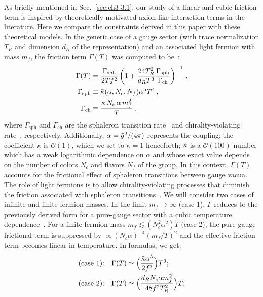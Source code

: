 As briefly mentioned in Sec.~\ref{sec:ch3-3.1}, our study of a linear and cubic friction term is inspired by theoretically motivated axion-like interaction terms in the literature. Here we compare the constraints derived in this paper with these theoretical models.
In the generic case of a gauge sector (with trace normalization $T_R$ and dimension $d_R$ of the representation) and an associated light fermion with mass $m_f$, the friction term $\Gamma (T)$ was computed to be~\cite{Berghaus:2020ekh}:
\begin{align}
    \Gamma (T)&=\frac{\Gamma_{\mathrm{sph}}}{2 T f^{2}}\left(1 + \frac{24 T_{R}^{2}}{d_{R} T^3} \frac{\Gamma_{\mathrm{sph}}}{\Gamma_{\mathrm{ch}}}\right)^{-1}\,, \label{eq:ch3-gamma1} \\
    \Gamma_{\mathrm{sph}}&\equiv\Tilde{\kappa}(\alpha,N_c,N_f)\alpha^5 T^4\,, \\
    \Gamma_{\mathrm{ch}}&\equiv \frac{\kappa\, N_c\,\alpha\, m_f^2}{T}\,,
\end{align}
where $\Gamma_{\mathrm{sph}}$ and $\Gamma_{\mathrm{ch}}$ are the sphaleron transition rate~\cite{Arnold:1996dy} and chirality-violating rate~\cite{Boyarsky:2020cyk}, respectively. Additionally, $\alpha=\Tilde{g}^2/(4\pi)$ represents the coupling; the coefficient $\kappa$ is $\mathcal{O}(1)$, which we set to $\kappa = 1$ henceforth; $\Tilde{\kappa}$ is a $\mathcal{O}(100)$ number which has a weak logarithmic dependence on $\alpha$ and whose exact value depends on the number of colors $N_c$ and flavors $N_f$ of the group. In this context, $\Gamma(T)$ accounts for the frictional effect of sphaleron transitions between gauge vacua. The role of light fermions is to allow chirality-violating processes that diminish the friction associated with sphaleron transitions~\cite{Berghaus:2020ekh}. We will consider two cases of infinite and finite fermion masses. In the limit $m_f \rightarrow \infty$ (case 1), $\Gamma$ reduces to the previously derived form for a pure-gauge sector with a cubic temperature dependence~\cite{Berghaus:2019whh}. For a finite fermion mass $m_f\lesssim (N_c^2\alpha^2)T$ (case 2), the pure-gauge frictional term is suppressed by $\propto (N_c\alpha)^{-4}(m_f/T)^2$ and the effective friction term becomes linear in temperature. In formulas, we get:
\begin{align}
    \text{(case 1):} \quad \Gamma(T)&\simeq \Big(\frac{\Tilde{\kappa} \alpha^5}{2f^2}\Big)T^3; \label{eq:ch3-gamma2} \\
    \text{(case 2):} \quad \Gamma(T)&\simeq \Big(\frac{d_R N_c \alpha m_f^2}{48 f^2 T_R^2}\Big)T; \label{eq:ch3-gamma3}
\end{align}
